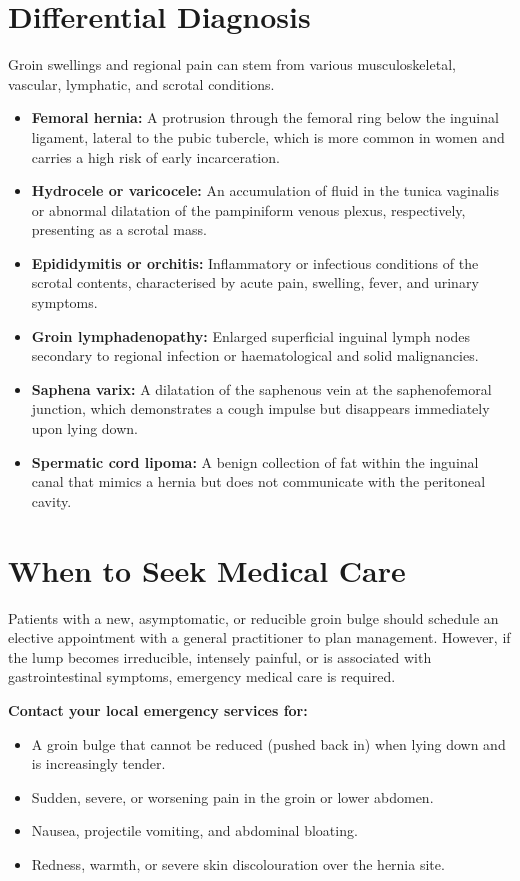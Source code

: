 \section*{Differential Diagnosis}
Groin swellings and regional pain can stem from various musculoskeletal, vascular, lymphatic, and scrotal conditions.
\begin{itemize}
    \item \textbf{Femoral hernia:} A protrusion through the femoral ring below the inguinal ligament, lateral to the pubic tubercle, which is more common in women and carries a high risk of early incarceration.
    \item \textbf{Hydrocele or varicocele:} An accumulation of fluid in the tunica vaginalis or abnormal dilatation of the pampiniform venous plexus, respectively, presenting as a scrotal mass.
    \item \textbf{Epididymitis or orchitis:} Inflammatory or infectious conditions of the scrotal contents, characterised by acute pain, swelling, fever, and urinary symptoms.
    \item \textbf{Groin lymphadenopathy:} Enlarged superficial inguinal lymph nodes secondary to regional infection or haematological and solid malignancies.
    \item \textbf{Saphena varix:} A dilatation of the saphenous vein at the saphenofemoral junction, which demonstrates a cough impulse but disappears immediately upon lying down.
    \item \textbf{Spermatic cord lipoma:} A benign collection of fat within the inguinal canal that mimics a hernia but does not communicate with the peritoneal cavity.
\end{itemize}

\section*{When to Seek Medical Care}
Patients with a new, asymptomatic, or reducible groin bulge should schedule an elective appointment with a general practitioner to plan management. However, if the lump becomes irreducible, intensely painful, or is associated with gastrointestinal symptoms, emergency medical care is required.

\textbf{Contact your local emergency services for:}
\begin{itemize}
    \item A groin bulge that cannot be reduced (pushed back in) when lying down and is increasingly tender.
    \item Sudden, severe, or worsening pain in the groin or lower abdomen.
    \item Nausea, projectile vomiting, and abdominal bloating.
    \item Redness, warmth, or severe skin discolouration over the hernia site.
\end{itemize}

